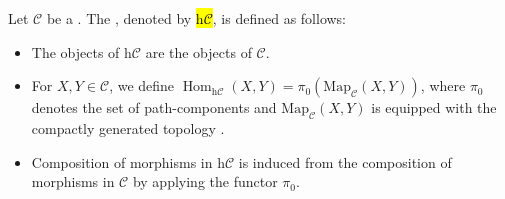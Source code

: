 \begin{definition} \label{definition:homotopy_category_of_a_topological_category}
Let $\mathcal{C}$ be a . The , denoted by \hl{$\mathrm{h}\mathcal{C}$}, is defined as follows:
\begin{itemize}
  \item The objects of $\mathrm{h}\mathcal{C}$ are the objects of $\mathcal{C}$.
  \item For $X, Y \in \mathcal{C}$, we define $\operatorname{Hom}_{\mathrm{h}\mathcal{C}}(X,Y) = \pi_0(\mathrm{Map}_{\mathcal{C}}(X,Y))$, where $\pi_0$ denotes the set of path-components  and $\mathrm{Map}_{\mathcal{C}}(X,Y)$ is equipped with the compactly generated topology .
  \item Composition of morphisms in $\mathrm{h}\mathcal{C}$ is induced from the composition of morphisms in $\mathcal{C}$ by applying the functor $\pi_0$.
\end{itemize}

\end{definition}
